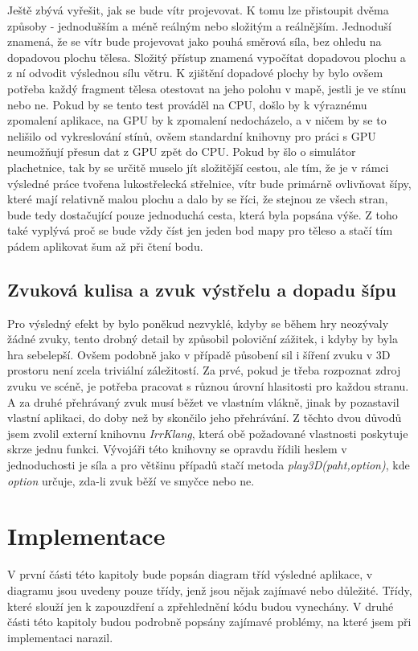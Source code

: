Ještě zbývá vyřešit, jak se bude vítr projevovat. K tomu lze přistoupit dvěma způsoby - jednodušším a méně reálným nebo složitým a reálnějším. Jednoduší znamená, že se vítr bude projevovat jako pouhá směrová síla, bez ohledu na dopadovou plochu tělesa. Složitý přístup znamená vypočítat dopadovou plochu a z ní odvodit výslednou sílu větru. K zjištění dopadové plochy by bylo ovšem potřeba každý fragment tělesa otestovat na jeho polohu v mapě, jestli je ve stínu nebo ne. Pokud by se tento test prováděl na CPU, došlo by k výraznému zpomalení aplikace, na GPU by k zpomalení nedocházelo, a v ničem by se to nelišilo od vykreslování stínů, ovšem standardní knihovny pro práci s GPU neumožňují přesun dat z GPU zpět do CPU. Pokud by šlo o simulátor plachetnice, tak by se určitě muselo jít složitější cestou, ale tím, že je v rámci výsledné práce tvořena lukostřelecká střelnice, vítr bude primárně ovlivňovat šípy, které mají relativně malou plochu a dalo by se říci, že stejnou ze všech stran, bude tedy dostačující pouze jednoduchá cesta, která byla popsána výše. Z toho také vyplývá proč se bude vždy číst jen jeden bod mapy pro těleso a stačí tím pádem aplikovat šum až při čtení bodu.

\section{Zvuková kulisa a zvuk výstřelu a dopadu šípu}
Pro výsledný efekt by bylo poněkud nezvyklé, kdyby se během hry neozývaly žádné zvuky, tento drobný detail by způsobil poloviční zážitek, i kdyby by byla hra sebelepší. Ovšem podobně jako v případě působení sil i šíření zvuku v 3D prostoru není zcela triviální záležitostí. Za prvé, pokud je třeba rozpoznat zdroj zvuku ve scéně, je potřeba pracovat s různou úrovní hlasitosti pro každou stranu. A za druhé přehrávaný zvuk musí běžet ve vlastním vlákně, jinak by pozastavil vlastní aplikaci, do doby než by skončilo jeho přehrávání. Z těchto dvou důvodů jsem zvolil externí knihovnu \emph{IrrKlang}\cite{irrKlang}, která obě požadované vlastnosti poskytuje skrze jednu funkci. Vývojáři této knihovny se opravdu řídili heslem v jednoduchosti je síla a pro většinu případů stačí metoda \emph{play3D(paht,option)}, kde \emph{option} určuje, zda-li zvuk běží ve smyčce nebo ne.  
\chapter{Implementace}\label{implementace}
V první části této kapitoly bude popsán diagram tříd výsledné aplikace, v diagramu jsou uvedeny pouze třídy, jenž jsou nějak zajímavé nebo důležité. Třídy, které slouží jen k zapouzdření a zpřehlednění kódu budou vynechány. V druhé části této kapitoly budou podrobně popsány zajímavé problémy, na které jsem při implementaci narazil.  
